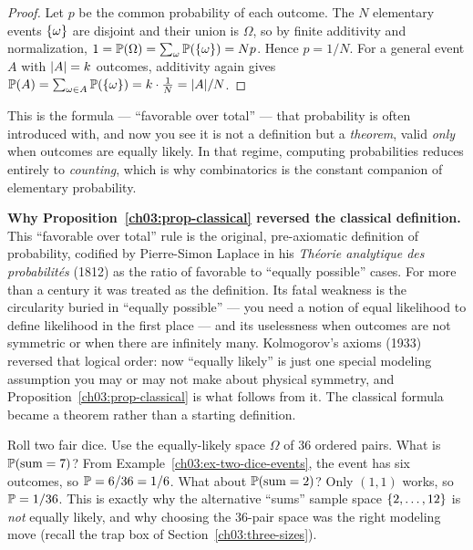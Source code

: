 \begin{proof}
Let $p$ be the common probability of each outcome. The $N$ elementary events
$\set{\omega}$ are disjoint and their union is $\Omega$, so by finite additivity
and normalization, $1 = \P(\Omega) = \sum_{\omega} \P(\set{\omega}) = Np$. Hence
$p = 1/N$. For a general event $A$ with $\abs{A} = k$ outcomes, additivity again
gives $\P(A) = \sum_{\omega \in A} \P(\set{\omega}) = k \cdot \frac{1}{N} =
\abs{A}/N$.
\end{proof}

This is the formula --- ``favorable over total'' --- that probability is often
introduced with, and now you see it is not a definition but a \emph{theorem},
valid \emph{only} when outcomes are equally likely. In that regime, computing
probabilities reduces entirely to \emph{counting}, which is why combinatorics is
the constant companion of elementary probability.

\begin{whybox}
\textbf{Why Proposition~\ref{ch03:prop-classical} reversed the classical definition.}
This ``favorable over total'' rule is the original, pre-axiomatic definition of
probability, codified by Pierre-Simon Laplace in his \emph{Th\'eorie analytique
des probabilit\'es} (1812) as the ratio of favorable to ``equally possible''
cases. For more than a century it was treated as the definition. Its fatal
weakness is the circularity buried in ``equally possible'' --- you need a notion
of equal likelihood to define likelihood in the first place --- and its
uselessness when outcomes are not symmetric or when there are infinitely many.
Kolmogorov's axioms (1933) reversed that logical order: now ``equally likely'' is
just one special modeling assumption you may or may not make about physical
symmetry, and Proposition~\ref{ch03:prop-classical} is what follows from it. The
classical formula became a theorem rather than a starting definition.
\end{whybox}

\begin{example}
\label{ch03:ex-dice-sum}
Roll two fair dice. Use the equally-likely space $\Omega$ of $36$ ordered pairs.
What is $\P(\text{sum} = 7)$? From Example~\ref{ch03:ex-two-dice-events}, the event
has six outcomes, so $\P = 6/36 = 1/6$. What about $\P(\text{sum} = 2)$? Only
$(1,1)$ works, so $\P = 1/36$. This is exactly why the alternative ``sums''
sample space $\set{2,\dots,12}$ is \emph{not} equally likely, and why choosing the
$36$-pair space was the right modeling move (recall the trap box of
Section~\ref{ch03:three-sizes}).
\end{example}

